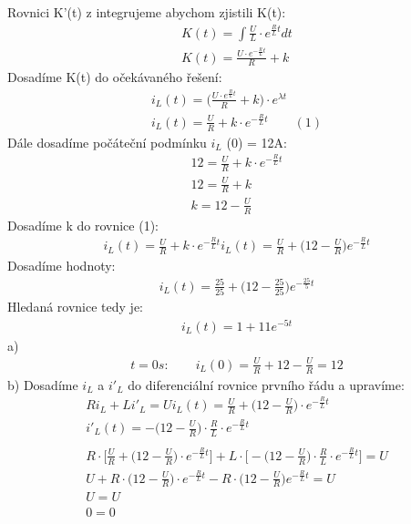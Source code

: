 Rovnici K'(t) z integrujeme abychom zjistili K(t):
\begin{gather*}
    K(t) = \int \frac{U}{L} \cdot e^{\frac{R}{L}t}dt\\
    K(t) = \frac{U \cdot e^{-\frac{R}{L}t}}{R} + k
\end{gather*}
Dosadíme K(t) do očekávaného řešení:
\begin{gather*}
    i_L (t) = \bigg( \frac{U \cdot e^{\frac{R}{L}t}}{R} + k \bigg) \cdot e^{\lambda t}\\
    i_L (t) = \frac{U}{R} + k \cdot e^{-\frac{R}{L}t} \qquad (1)
\end{gather*}
Dále dosadíme počáteční podmínku ${i_L}$ (0) = 12A:
\begin{gather*}
    12 = \frac{U}{R} + k \cdot e^{-\frac{R}{L}t}\\
    12 = \frac{U}{R} + k\\
    k  = 12 - \frac{U}{R} 
\end{gather*}
Dosadíme k do rovnice (1):
\begin{gather*}
    i_L (t) = \frac{U}{R} + k \cdot e^{-\frac{R}{L}t}
    i_L (t) = \frac{U}{R} + \bigg( 12 - \frac{U}{R} \bigg) e^{-\frac{R}{L}t}
\end{gather*}
Dosadíme hodnoty:
\begin{gather*}
    i_L (t) = \frac{25}{25} + \bigg( 12 - \frac{25}{25} \bigg) e^{-\frac{25}{5}t}
\end{gather*}
Hledaná rovnice tedy je:
\begin{gather*}
    i_L (t) = 1 + 11 e^{-5t}
\end{gather*}
a)
\begin{gather*}
    t = 0s : \qquad i_L (0) = \frac{U}{R} + 12 - \frac{U}{R} = 12
\end{gather*}
b) Dosadíme ${i_L}$ a ${i'_L}$ do diferenciální rovnice prvního řádu a upravíme:
\begin{gather*}
    Ri_L + Li'_L = U
    i_L (t) = \frac{U}{R} + \bigg( 12 - \frac{U}{R} \bigg) \cdot e^{-\frac{R}{L}t}\\
    i'_L(t) = - \bigg( 12 - \frac{U}{R} \bigg) \cdot \frac{R}{L} \cdot e^{-\frac{R}{L}t}\\\\
    R \cdot \bigg[ \frac{U}{R} + \bigg( 12 - \frac{U}{R} \bigg) \cdot e^{-\frac{R}{L}t} \bigg] + L \cdot \bigg[ - \bigg( 12 - \frac{U}{R} \bigg) \cdot \frac{R}{L} \cdot e^{-\frac{R}{L}t} \bigg] = U\\
    U + R \cdot \bigg( 12 - \frac{U}{R} \bigg) \cdot e^{-\frac{R}{L}t} - R \cdot \bigg( 12 - \frac{U}{R} \bigg) e^{-\frac{R}{L}t} = U\\
    U = U\\
    0 = 0
\end{gather*}